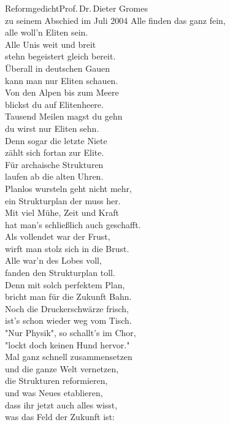 \begin{lied*}{Reformgedicht}{Prof.\,Dr.\,Dieter Gromes\\zu seinem Abschied im Juli 2004}
Alle finden das ganz fein,\\
alle woll'n Eliten sein.\\
Alle Unis weit und breit\\
stehn begeistert gleich bereit.\\

Überall in deutschen Gauen\\
kann man nur Eliten schauen.\\
Von den Alpen bis zum Meere\\
blickst du auf Elitenheere.\\
Tausend Meilen magst du gehn\\
du wirst nur Eliten sehn.\\
Denn sogar die letzte Niete\\
zählt sich fortan zur Elite.\\

Für archaische Strukturen\\
laufen ab die alten Uhren.\\
Planlos wursteln geht nicht mehr,\\
ein Strukturplan der muss her.\\
Mit viel Mühe, Zeit und Kraft\\
hat man's schließlich auch geschafft.\\
Als vollendet war der Frust,\\
wirft man stolz sich in die Brust.\\
Alle war'n des Lobes voll,\\
fanden den Strukturplan toll.\\
Denn mit solch perfektem Plan,\\
bricht man für die Zukunft Bahn.\\

Noch die Druckerschwärze frisch,\\
ist's schon wieder weg vom Tisch.\\
"Nur Physik", so schallt's im Chor,\\
"lockt doch keinen Hund hervor."\\
Mal ganz schnell zusammensetzen\\
und die ganze Welt vernetzen,\\
die Strukturen reformieren,\\
und was Neues etablieren,\\
dass ihr jetzt auch alles wisst,\\
was das Feld der Zukunft ist:\\


\end{lied*}
